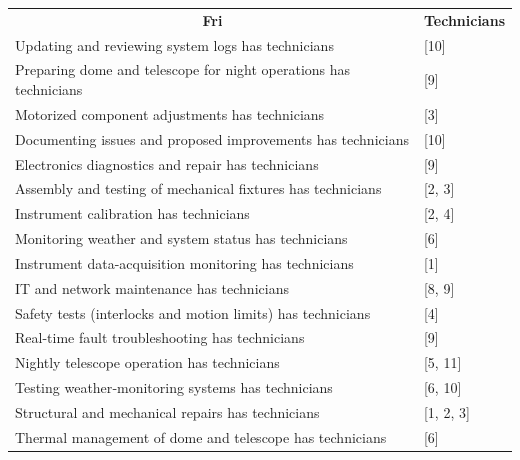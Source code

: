 \documentclass{article}
\begin{document}
\begin{table}[!ht]
\begin{tabular}{ll}
\multicolumn{1}{c}{\textbf{Fri}}                                  & \multicolumn{1}{c}{\textbf{Technicians}} \\
Updating and reviewing system logs has technicians                & {[}10{]}                                 \\
Preparing dome and telescope for night operations has technicians & {[}9{]}                                  \\
Motorized component adjustments has technicians                   & {[}3{]}                                  \\
Documenting issues and proposed improvements has technicians      & {[}10{]}                                 \\
Electronics diagnostics and repair has technicians                & {[}9{]}                                  \\
Assembly and testing of mechanical fixtures has technicians       & {[}2, 3{]}                               \\
Instrument calibration has technicians                            & {[}2, 4{]}                               \\
Monitoring weather and system status has technicians              & {[}6{]}                                  \\
Instrument data-acquisition monitoring has technicians            & {[}1{]}                                  \\
IT and network maintenance has technicians                        & {[}8, 9{]}                               \\
Safety tests (interlocks and motion limits) has technicians       & {[}4{]}                                  \\
Real-time fault troubleshooting has technicians                   & {[}9{]}                                  \\
Nightly telescope operation has technicians                       & {[}5, 11{]}                              \\
Testing weather‑monitoring systems has technicians                & {[}6, 10{]}                              \\
Structural and mechanical repairs has technicians                 & {[}1, 2, 3{]}                            \\
Thermal management of dome and telescope has technicians          & {[}6{]}                                  \\                                 
\end{tabular}
\end{table}
\end{document}
